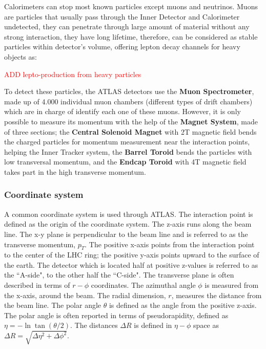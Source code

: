 Calorimeters can stop most known particles except muons and neutrinos. Muons are particles that usually pass through the
Inner Detector and Calorimeter undetected, they can penetrate through large amount of material without any strong
interaction, they have long lifetime, therefore, can be considered as stable particles within detector's volume, offering lepton decay channels for heavy objects as:\par

\textcolor{red}{ADD lepto-production from heavy particles}
\par
To detect these particles, the ATLAS detectors use the {\bf Muon Spectrometer}, made up of 4.000 individual muon chambers
(different types of drift
chambers) which are in charge of identify each one of these muons. However, it is only possible to measure its momentum with the help of the {\bf
Magnet System}, made of three sections; the {\bf Central Solenoid Magnet} with 2T
magnetic field bends the
charged particles for momentum measurement near the interaction points, helping the Inner Tracker system, the {\bf
Barrel Toroid} bends the particles with low transversal momentum, and the {\bf Endcap Toroid} with 4T magnetic field takes part in the
high transverse momentum.\par
\subsubsection{Coordinate system}

A common coordinate system is used through ATLAS. The interaction point is defined as the origin of the coordinate
system. The z-axis runs along the beam line. The x-y plane is perpendicular to the beam line and is referred to as the
transverse momentum, $p_T$. The positive x-axis points from the interaction point to the center of the LHC ring; the
positive y-axis points upward to the surface of the earth. The detector which is located half at positive z-values is referred to as the
``A-side", to the other half the ``C-side". The transverse plane is often described in terms of $r-\phi$ coordinates. The
azimuthal angle $\phi$ is measured from the x-axis, around the beam. The radial dimension, $r$, measures the distance
from the beam line. The polar angle $\theta$ is defined as the angle from the positive z-axis. The polar angle is often
reported in terms of pseudorapidity, defined as $\eta = -\ln \tan (\theta/2)$. The distances $\Delta R$ is defined in
$\eta-\phi$ space as $\Delta R = \sqrt{\Delta \eta^2 + \Delta \phi^2}$.\par





